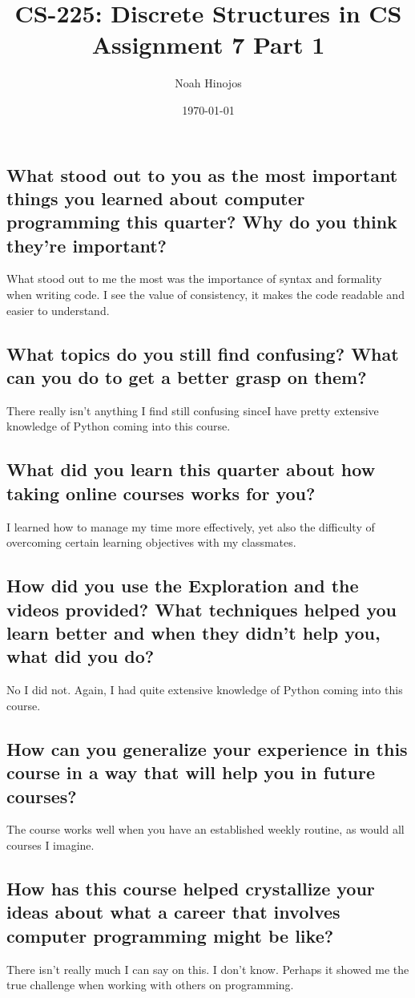 \documentclass[12pt]{article}
\title{
  \textbf{CS-225: Discrete Structures in CS} \\
  Assignment 7 Part 1
  }
\author{Noah Hinojos}
\date{\today}
\begin{document}
\maketitle
\subsection*{What stood out to you as the most important things you learned about computer programming this quarter? Why do you think they're important?}
What stood out to me the most was the importance of syntax and formality when writing code. I see the value of consistency, it makes the code readable and easier to understand.
\subsection*{What topics do you still find confusing? What can you do to get a better grasp on them?}
There really isn't anything I find still confusing sinceI have pretty extensive knowledge of Python coming into this course.
\subsection*{What did you learn this quarter about how taking online courses works for you?}
I learned how to manage my time more effectively, yet also the difficulty of overcoming certain learning objectives with my classmates.
\subsection*{How did you use the Exploration and the videos provided? What techniques helped you learn better and when they didn't help you, what did you do?}
No I did not. Again, I had quite extensive knowledge of Python coming into this course.
\subsection*{How can you generalize your experience in this course in a way that will help you in future courses?}
The course works well when you have an established weekly routine, as would all courses I imagine. 
\subsection*{How has this course helped crystallize your ideas about what a career that involves computer programming might be like?}
There isn't really much I can say on this. I don't know. Perhaps it showed me the true challenge when working with others on programming.
\end{document}
